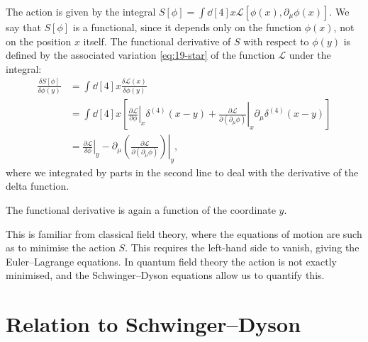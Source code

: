 \begin{appendices}
The action is given by the integral $S[\phi] = \int \dd[4]{x} \mathscr{L}[\phi(x), \partial_{\mu} \phi(x)]$. We say that $S[\phi]$ is a functional, since it depends only on the function $\phi(x)$, not on the position $x$ itself.  The functional derivative of $S$ with respect to $\phi(y)$ is defined by the associated variation \eqref{eq:19-star} of the function $\mathscr{L}$ under the integral:
\begin{align}
  \frac{\delta S [\phi]}{\delta \phi(y)} &= \int \dd[4]{x} \frac{\delta \mathscr{L}(x)}{\delta \phi(y)} \\
				      &= \int \dd[4]{x} \left[ \left. \frac{\partial \mathscr{L}}{\partial \phi} \right\rvert_{x} \delta^{(4)} (x - y) 
				      + \left. \frac{\partial \mathscr{L}}{\partial (\partial_{\mu} \phi)} \right\rvert_{x}  \partial_{\mu} \delta^{(4)}(x - y) \right] \\
				      &= \left. \frac{\partial \mathscr{L}}{\delta \phi} \right\rvert_{y} - \left. \partial_{\mu} \left( \frac{\partial \mathscr{L}}{\partial (\partial_{\mu} \phi)} \right) \right\rvert_{y}, \label{eq:19-svar}
\end{align}
where we integrated by parts in the second line to deal with the derivative of the delta function.
\begin{remark}
  The functional derivative is again a function of the coordinate $y$.
\end{remark}
This is familiar from classical field theory, where the equations of motion are such as to minimise the action $S$. This requires the left-hand side to vanish, giving the Euler--Lagrange equations. In quantum field theory the action is not exactly minimised, and the Schwinger--Dyson equations allow us to quantify this.

\section{Relation to Schwinger--Dyson}%
\label{sec:relation_to_schwinger_dyson}


\end{appendices}
